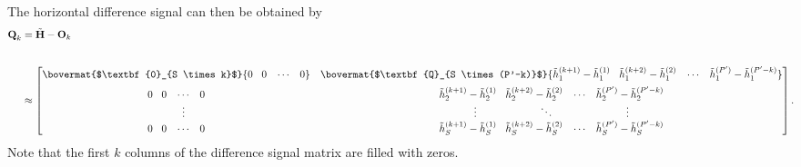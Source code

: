 The horizontal difference signal can then be obtained by 
\begin{align}
\textbf{Q}_{k}&=\tilde{\textbf{H}} - \textbf{O}_{k}\\[2em]
&\approx
\begin{bmatrix}
\bovermat{$\textbf{0}_{S \times k}$}{\vspace{0.2cm}0 \hspace{0.3cm} 0\hspace{0.3cm}\cdots \hspace{0.3cm}0}&\bovermat{$\textbf{Q}_{S \times (P'-k)}$}{\vspace{0.2cm}\tilde{h}^{(k+1)}_{1}-\tilde{h}^{(1)}_{1} \hspace{0.3cm} \tilde{h}^{(k+2)}_{1}-\tilde{h}^{(2)}_{1} \hspace{0.3cm} \cdots \hspace{0.3cm} \tilde{h}^{(P')}_{1}-\tilde{h}^{(P'-k)}_{1}}\\[0.5em]
%
{0 \hspace{0.3cm} 0\hspace{0.3cm}\cdots \hspace{0.3cm}0}&{\tilde{h}^{(k+1)}_{2}-\tilde{h}^{(1)}_{2} \hspace{0.3cm} \tilde{h}^{(k+2)}_{2}-\tilde{h}^{(2)}_{2} \hspace{0.3cm} \cdots \hspace{0.3cm} \tilde{h}^{(P')}_{2}-\tilde{h}^{(P'-k)}_{2}}\\
%
\hspace{0.5cm} \vdots& \vdots \kern 6em \ddots \kern 7em \vdots\\
%
{0 \hspace{0.3cm} 0\hspace{0.3cm}\cdots \hspace{0.3cm}0}&{\tilde{h}^{(k+1)}_{S}-\tilde{h}^{(1)}_{S} \hspace{0.3cm} \tilde{h}^{(k+2)}_{S}-\tilde{h}^{(2)}_{S} \hspace{0.3cm} \cdots \hspace{0.3cm} \tilde{h}^{(P')}_{S}-\tilde{h}^{(P'-k)}_{S}}\nonumber
\end{bmatrix}.\!\!\!
%
\end{align}
Note that the first $k$ columns of the difference signal matrix are filled with zeros. 

